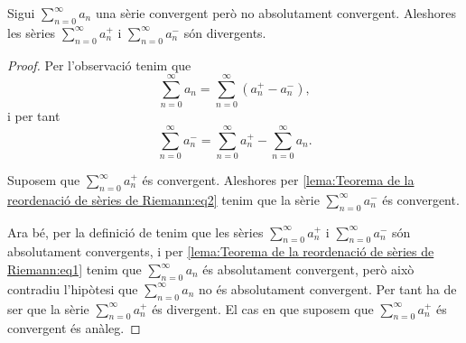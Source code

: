 \documentclass[../../Main.tex]{subfiles}
\begin{document}
	\begin{lemma}
		\label{lema:Teorema de la reordenació de sèries de Riemann}
		Sigui \(\sum_{n=0}^{\infty}a_{n}\) una sèrie convergent però no absolutament convergent. Aleshores les sèries \(\sum_{n=0}^{\infty}a^{+}_{n}\) i \(\sum_{n=0}^{\infty}a^{-}_{n}\) són divergents.
		\begin{proof}
			Per l'observació  tenim que
			\begin{equation}
				\label{lema:Teorema de la reordenació de sèries de Riemann:eq1}
				\sum_{n=0}^{\infty}a_{n}=\sum_{n=0}^{\infty}\left(a^{+}_{n}-a^{-}_{n}\right),
			\end{equation}
			i per tant
			\begin{equation}
				\label{lema:Teorema de la reordenació de sèries de Riemann:eq2}
				\sum_{n=0}^{\infty}a^{-}_{n}=\sum_{n=0}^{\infty}a^{+}_{n}-\sum_{n=0}^{\infty}a_{n}.
			\end{equation}
			
			Suposem que \(\sum_{n=0}^{\infty}a^{+}_{n}\) és convergent. Aleshores per \eqref{lema:Teorema de la reordenació de sèries de Riemann:eq2} tenim que la sèrie \(\sum_{n=0}^{\infty}a^{-}_{n}\) és convergent.
			
			Ara bé, per la definició de  tenim que les sèries \(\sum_{n=0}^{\infty}a^{+}_{n}\) i \(\sum_{n=0}^{\infty}a^{-}_{n}\) són absolutament convergents, i per \eqref{lema:Teorema de la reordenació de sèries de Riemann:eq1} tenim que \(\sum_{n=0}^{\infty}a_{n}\) és absolutament convergent, però això contradiu l'hipòtesi que \(\sum_{n=0}^{\infty}a_{n}\) no és absolutament convergent. Per tant ha de ser que la sèrie \(\sum_{n=0}^{\infty}a^{+}_{n}\) és divergent. El cas en que suposem que \(\sum_{n=0}^{\infty}a^{+}_{n}\) és convergent és anàleg.
		\end{proof}
	\end{lemma}
\end{document}
